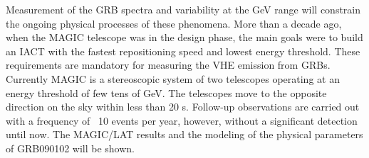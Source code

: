 


\bigskip



\bigskip

\noindent Measurement of the GRB spectra and variability at the GeV range will constrain the ongoing physical processes of these phenomena. More than a decade ago, when the MAGIC telescope was in the design phase, the main goals were to build an IACT with the fastest repositioning speed and lowest energy threshold. These requirements are mandatory for measuring the VHE emission from GRBs. Currently MAGIC is a stereoscopic system of two telescopes operating at an energy threshold of few tens of GeV. The telescopes move to the opposite direction on the sky within less than 20 s. Follow-up observations are carried out with a frequency of ~10 events per year, however, without a significant detection until now. The MAGIC/LAT results and the modeling of the physical parameters of GRB090102 will be shown.

